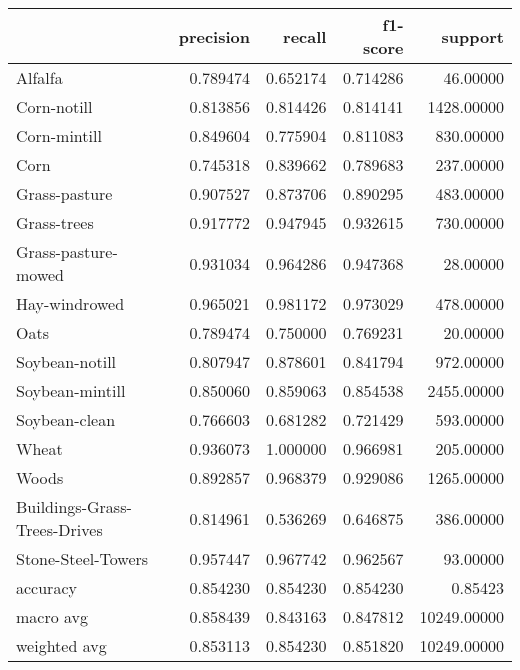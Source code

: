 \begin{tabular}{lrrrr}
\toprule
{} &  precision &    recall &  f1-score &      support \\
\midrule
Alfalfa                      &   0.789474 &  0.652174 &  0.714286 &     46.00000 \\
Corn-notill                  &   0.813856 &  0.814426 &  0.814141 &   1428.00000 \\
Corn-mintill                 &   0.849604 &  0.775904 &  0.811083 &    830.00000 \\
Corn                         &   0.745318 &  0.839662 &  0.789683 &    237.00000 \\
Grass-pasture                &   0.907527 &  0.873706 &  0.890295 &    483.00000 \\
Grass-trees                  &   0.917772 &  0.947945 &  0.932615 &    730.00000 \\
Grass-pasture-mowed          &   0.931034 &  0.964286 &  0.947368 &     28.00000 \\
Hay-windrowed                &   0.965021 &  0.981172 &  0.973029 &    478.00000 \\
Oats                         &   0.789474 &  0.750000 &  0.769231 &     20.00000 \\
Soybean-notill               &   0.807947 &  0.878601 &  0.841794 &    972.00000 \\
Soybean-mintill              &   0.850060 &  0.859063 &  0.854538 &   2455.00000 \\
Soybean-clean                &   0.766603 &  0.681282 &  0.721429 &    593.00000 \\
Wheat                        &   0.936073 &  1.000000 &  0.966981 &    205.00000 \\
Woods                        &   0.892857 &  0.968379 &  0.929086 &   1265.00000 \\
Buildings-Grass-Trees-Drives &   0.814961 &  0.536269 &  0.646875 &    386.00000 \\
Stone-Steel-Towers           &   0.957447 &  0.967742 &  0.962567 &     93.00000 \\
accuracy                     &   0.854230 &  0.854230 &  0.854230 &      0.85423 \\
macro avg                    &   0.858439 &  0.843163 &  0.847812 &  10249.00000 \\
weighted avg                 &   0.853113 &  0.854230 &  0.851820 &  10249.00000 \\
\bottomrule
\end{tabular}

